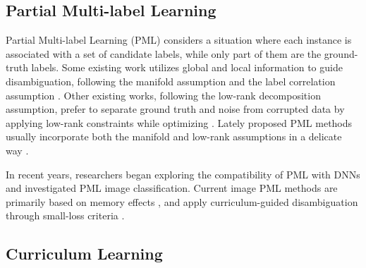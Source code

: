 \documentclass[letterpaper]{article} %
\begin{document}

\subsection{Partial Multi-label Learning}
  
  Partial Multi-label Learning (PML) considers a situation where each instance is associated with a set of candidate labels, while only part of them are the ground-truth labels. %
  Some existing work utilizes global and local information to guide disambiguation, following the manifold assumption and the label correlation assumption \cite{PML-LD,DRAMA,PML-SALC}. Other existing works, following the low-rank decomposition assumption, prefer to separate ground truth and noise from corrupted data by applying low-rank constraints while optimizing \cite{PML-LRS,PML-NI}. 
  Lately proposed PML methods usually incorporate both the manifold and low-rank assumptions in a delicate way \cite{GLADE,PAKS,GLC,NLR}. %

  In recent years, researchers began exploring the compatibility of PML with DNNs and investigated PML image classification. Current image PML methods are primarily based on memory effects \cite{a-closer-look}, and apply curriculum-guided disambiguation through small-loss criteria \cite{PML-CDCR,UNM}.

\subsection{Curriculum Learning}

\end{document}
